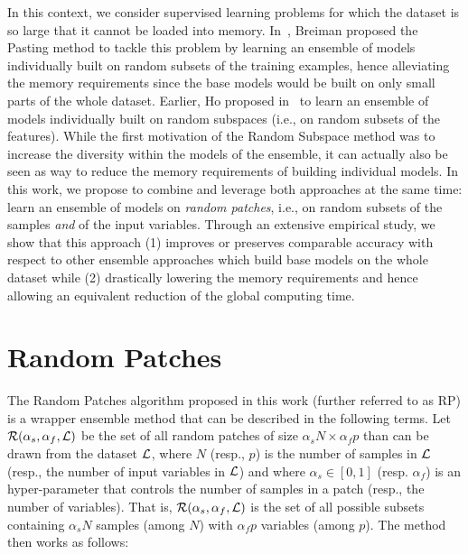 In this context, we consider supervised learning problems for which the dataset
is so large that it cannot be loaded into memory. In~\citep{breiman:1999},
Breiman proposed the Pasting method to tackle this problem by learning an
ensemble of models individually built on random subsets of the training
examples, hence alleviating the memory requirements since the base models would
be built on only small parts of the whole dataset. Earlier, Ho proposed
in~\citep{ho:1998} to learn an ensemble of models individually built on random
subspaces (i.e., on random subsets of the features). While the first motivation
of the Random Subspace method was to increase the diversity within the models
of the ensemble, it can actually also be seen as way to reduce the memory
requirements of building individual models. In this work, we propose to combine
and leverage both approaches at the same time: learn an ensemble of models on
\textit{random patches}, i.e., on random subsets of the samples \textit{and} of
the input variables. Through an extensive empirical study, we show that this
approach (1) improves or preserves comparable accuracy with respect to other
ensemble approaches which build base models on the whole dataset while (2)
drastically lowering the memory requirements and hence allowing an equivalent
reduction of the global computing time.

\section{Random Patches}
\label{sec:9:rp}

The Random Patches algorithm proposed in this work (further referred to as RP)
is a wrapper ensemble method that can be described in the following terms. Let
${\cal R}(\alpha_s, \alpha_f, {\cal L})$ be the set of all random patches of
size $\alpha_s N \times \alpha_f p$ than can be drawn from the dataset ${\cal
L}$, where $N$ (resp., $p$) is the number of samples in ${\cal L}$ (resp.,  the
number of input variables in ${\cal L}$) and where $\alpha_s \in [0, 1]$ (resp.
$\alpha_f$) is an hyper-parameter that controls the number of samples in a
patch (resp., the number of variables). That is, ${\cal R}(\alpha_s, \alpha_f,
{\cal L})$ is the set of all possible subsets containing $\alpha_s N$ samples
(among $N$) with $\alpha_f p$ variables (among $p$). The method then works as
follows:


